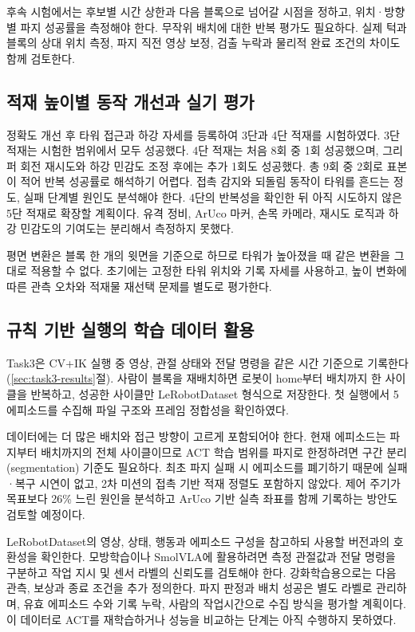 후속 시험에서는 후보별 시간 상한과 다음 블록으로 넘어갈 시점을 정하고, 위치·방향별 파지 성공률을 측정해야 한다. 무작위 배치에 대한 반복 평가도 필요하다. 실제 턱과 블록의 상대 위치 측정, 파지 직전 영상 보정, 검출 누락과 물리적 완료 조건의 차이도 함께 검토한다.

\subsection{적재 높이별 동작 개선과 실기 평가}
\label{sec:stack-extension}
정확도 개선 후 타워 접근과 하강 자세를 등록하여 3단과 4단 적재를 시험하였다. 3단 적재는 시험한 범위에서 모두 성공했다. 4단 적재는 처음 8회 중 1회 성공했으며, 그리퍼 회전 재시도와 하강 민감도 조정 후에는 추가 1회도 성공했다. 총 9회 중 2회로 표본이 적어 반복 성공률로 해석하기 어렵다. 접촉 감지와 되돌림 동작이 타워를 흔드는 정도, 실패 단계별 원인도 분석해야 한다. 4단의 반복성을 확인한 뒤 아직 시도하지 않은 5단 적재로 확장할 계획이다. 유격 정비, ArUco 마커, 손목 카메라, 재시도 로직과 하강 민감도의 기여도는 분리해서 측정하지 못했다.

평면 변환은 블록 한 개의 윗면을 기준으로 하므로 타워가 높아졌을 때 같은 변환을 그대로 적용할 수 없다. 초기에는 고정한 타워 위치와 기록 자세를 사용하고, 높이 변화에 따른 관측 오차와 적재물 재선택 문제를 별도로 평가한다.

\subsection{규칙 기반 실행의 학습 데이터 활용}
\label{sec:dataset-extension}
Task3은 CV+IK 실행 중 영상, 관절 상태와 전달 명령을 같은 시간 기준으로 기록한다(\ref{sec:task3-results}절). 사람이 블록을 재배치하면 로봇이 home부터 배치까지 한 사이클을 반복하고, 성공한 사이클만 LeRobotDataset 형식으로 저장한다. 첫 실행에서 5에피소드를 수집해 파일 구조와 프레임 정합성을 확인하였다.

데이터에는 더 많은 배치와 접근 방향이 고르게 포함되어야 한다. 현재 에피소드는 파지부터 배치까지의 전체 사이클이므로 ACT 학습 범위를 파지로 한정하려면 구간 분리(segmentation) 기준도 필요하다. 최초 파지 실패 시 에피소드를 폐기하기 때문에 실패·복구 시연이 없고, 2차 미션의 접촉 기반 적재 정렬도 포함하지 않았다. 제어 주기가 목표보다 26\% 느린 원인을 분석하고 ArUco 기반 실측 좌표를 함께 기록하는 방안도 검토할 예정이다.

LeRobotDataset의 영상, 상태, 행동과 에피소드 구성을 참고하되 사용할 버전과의 호환성을 확인한다\cite{lerobot-dataset}. 모방학습이나 SmolVLA에 활용하려면 측정 관절값과 전달 명령을 구분하고 작업 지시 및 센서 라벨의 신뢰도를 검토해야 한다\cite{smolvla}. 강화학습용으로는 다음 관측, 보상과 종료 조건을 추가 정의한다. 파지 판정과 배치 성공은 별도 라벨로 관리하며, 유효 에피소드 수와 기록 누락, 사람의 작업시간으로 수집 방식을 평가할 계획이다. 이 데이터로 ACT를 재학습하거나 성능을 비교하는 단계는 아직 수행하지 못하였다.
\FloatBarrier
